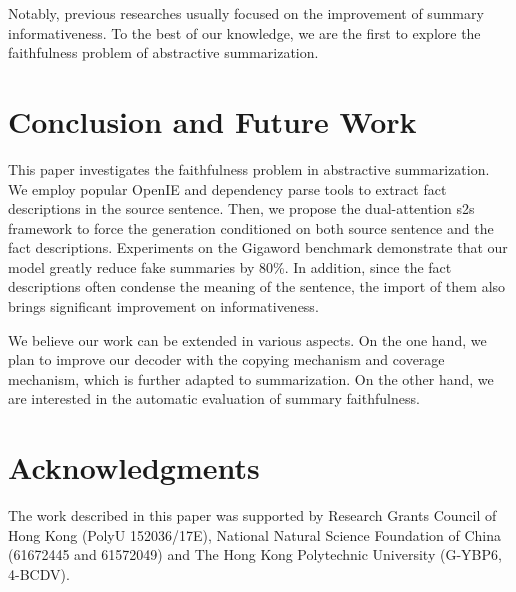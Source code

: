 \documentclass[letterpaper]{article} \usepackage{aaai18}  \usepackage{times}  \usepackage{helvet}  \usepackage{courier}  \usepackage{url}  \usepackage{graphicx}  \usepackage{amsfonts}
\begin{document}
	Notably, previous researches usually focused on the improvement of summary informativeness.
	To the best of our knowledge, we are the first to explore the faithfulness problem of abstractive summarization.
	
	
	\section{Conclusion and Future Work}
	This paper investigates the faithfulness problem in abstractive summarization.
	We employ popular OpenIE and dependency parse tools to extract fact descriptions in the source sentence.
	Then, we propose the dual-attention s2s framework to force the generation conditioned on both source sentence and the fact descriptions.
	Experiments on the Gigaword benchmark demonstrate that our model greatly reduce fake summaries by 80\%.
	In addition, since the fact descriptions often condense the meaning of the sentence, the import of them also brings significant improvement on informativeness.
	
	We believe our work can be extended in various aspects.
	On the one hand, we plan to improve our decoder with the copying mechanism and coverage mechanism, which is further adapted to summarization.
	On the other hand, we are interested in the automatic evaluation of summary faithfulness.
	
	\section{ Acknowledgments}
	The work described in this paper was supported by Research Grants Council of Hong Kong (PolyU 152036/17E), National Natural Science Foundation of China (61672445 and 61572049) and The Hong Kong Polytechnic University (G-YBP6, 4-BCDV).
	
	
	
	
	
	
	
\end{document}
